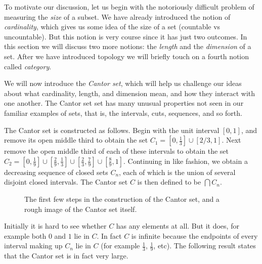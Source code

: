 \documentclass[11pt,oneside]{amsbook}
\theoremstyle{definition}
\theoremstyle{plain}
\theoremstyle{definition}
\theoremstyle{remark}
\numberwithin{equation}{section}
\numberwithin{figure}{section}
\begin{document}
To motivate our discussion, let us begin with the notoriously difficult problem of measuring the \emph{size} of a subset. We have already introduced the notion of \emph{cardinality}, which gives us some idea of the size of a set (countable vs uncountable). But this notion is very course since it has just two outcomes. In this section we will discuss two more notions: the \emph{length} and the \emph{dimension} of a set. After we have introduced topology we will briefly touch on a fourth notion called \emph{category}.

We will now introduce the \emph{Cantor set}, which will help us challenge our ideas about what cardinality, length, and dimension mean, and how they interact with one another. The Cantor set set has many unusual properties not seen in our familiar examples of sets, that is, the intervals, cuts, sequences, and so forth.

The Cantor set is constructed as follows. Begin with the unit interval $[0,1]$, and remove its open middle third to obtain the set $C_1=[0,\frac13]\cup[2/3,1]$. Next remove the open middle third of each of these intervals to obtain the set $C_2=[0,\frac19]\cup[\frac29,\frac13]
\cup[\frac23,\frac79]\cup[\frac89,1]$. Continuing in like fashion, we obtain a decreasing sequence of closed sets $C_n$, each of which is the union of several disjoint closed intervals. The Cantor set $C$ is then defined to be $\bigcap C_n$.

\begin{figure}[h]
\begin{center}
\end{center}
\caption{The first few steps in the construction of the Cantor set, and a rough image of the Cantor set itself.\label{fig:cantor-set}}
\end{figure}

Initially it is hard to see whether $C$ has any elements at all. But it does, for example both $0$ and $1$ lie in $C$. In fact $C$ is infinite because the endpoints of every interval making up $C_n$ lie in $C$ (for example $\frac13$, $\frac19$, etc). The following result states that the Cantor set is in fact very large.
\end{document}
